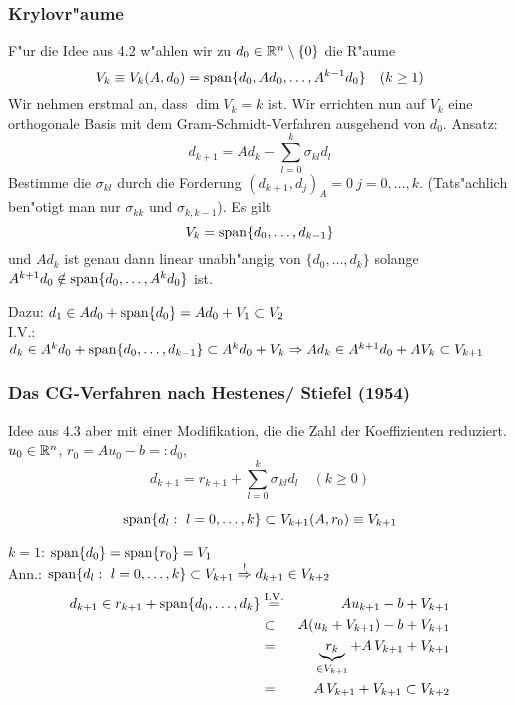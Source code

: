 \documentclass{scrartcl}
\begin{document}
\subsubsection{Krylovr"aume}
F"ur die Idee aus 4.2 w"ahlen wir zu $d_0 \in \mathbb{R}^n \setminus \{ 0 \}$ die R"aume
$$ V_k \equiv V_k(A, d_0) = \mathrm{span} \{ d_0, Ad_0, \ldots, A^{k-1} d_0 \} \quad (k \geq 1)$$
Wir nehmen erstmal an, dass $\dim V_k = k$ ist. Wir errichten nun auf $V_k$ eine orthogonale Basis mit dem Gram-Schmidt-Verfahren ausgehend von $d_0$. Ansatz:
$$ d_{k+1} = A d_k - \sum\limits_{l=0}^k \sigma_{kl} d_l$$
Bestimme die $\sigma_{kl}$ durch die Forderung $(d_{k+1}, d_j)_A = 0 \ j=0, \ldots, k$. (Tats"achlich ben"otigt man nur $\sigma_{kk}$ und $\sigma_{k,k-1}$). Es gilt
$$ V_k = \mathrm{span} \{ d_0, \ldots, d_{k-1} \}$$ 
und $Ad_k$ ist genau dann linear unabh"angig von $\{ d_0, \ldots, d_k \}$ solange $A^{k+1} d_0 \notin \mathrm{span} \{ d_0, \ldots, A^k d_0 \}$ ist.
\begin{Bew}
Dazu: $d_1 \in Ad_0 + \mathrm{span}\{ d_0 \} = Ad_0 + V_1 \subset V_2$ \\
I.V.: $d_k \in A^k d_0 + \mathrm{span} \{ d_0 , \ldots, d_{k-1} \} \subset A^k d_0 + V_k \Rightarrow Ad_k \in A^{k+1} d_0 + A V_k \subset V_{k+1}$
\end{Bew}
\subsubsection{Das CG-Verfahren nach Hestenes/ Stiefel (1954)}
Idee aus 4.3 aber mit einer Modifikation, die die Zahl der Koeffizienten reduziert. \\
$u_0 \in \mathbb{R}^n$, $r_0 = Au_0 - b =: d_0$,
$$d_{k+1} = r_{k+1} + \sum\limits_{l=0}^k \sigma_{kl} d_l \quad (k \geq 0)$$

\begin{Lemma}
$$\mathrm{span} \{ d_l: \ l=0, \ldots, k \} \subset V_{k+1} (A, r_0) \equiv V_{k+1}$$
\end{Lemma}
\begin{Bew}
$k=1$: $\mathrm{span} \{ d_0 \} = \mathrm{span} \{ r_0 \} = V_1$ \\
Ann.: $\mathrm{span} \{ d_l: \ l=0, \ldots, k \} \subset V_{k+1} \stackrel{!}{\Rightarrow} d_{k+1} \in V_{k+2}$ 
\begin{eqnarray*}
d_{k+1} \in r_{k+1} + \mathrm{span} \{ d_0, \ldots, d_k \} & \stackrel{\mathrm{I.V.}}{=} & A u_{k+1} - b + V_{k+1} \\
& \subset & A(u_k + V_{k+1}) - b + V_{k+1} \\
& = & \underbrace{r_k}_{\in V_{k+1}} + A \, V_{k+1} + V_{k+1} \\
& = & A \, V_{k+1} + V_{k+1} \subset V_{k+2}
\end{eqnarray*}
\end{Bew}
\end{document}
